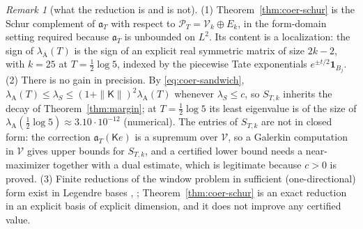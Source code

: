 \documentclass[11pt]{amsart}
\theoremstyle{definition}
\theoremstyle{remark}
\newtheorem{remark}[theorem]{Remark}
\newcommand{\PT}{\mathcal P_T}
\newcommand{\lamA}{\lambda_{\mathrm A}(T)}
\begin{document}
\begin{remark}[what the reduction is and is not]\label{rem:coer-honest}
(1) Theorem~\ref{thm:coer-schur} is the Schur complement of $\mathfrak a_T$ with respect to
$\PT=\mathcal V_k\oplus E_k$, in the form-domain setting required because $\mathfrak a_T$ is unbounded on $L^2$.
Its content is a localization: the sign of $\lamA$ is the sign of an explicit real symmetric matrix of size
$2k-2$, with $k=25$ at $T=\frac12\log5$, indexed by the piecewise Tate exponentials $e^{\pm t/2}\mathbf 1_{B_j}$.
(2) There is no gain in precision. By \eqref{eq:coer-sandwich}, $\lamA\le\lambda_S\le(1+\|\mathsf K\|)^2\lamA$
whenever $\lambda_S\le c$, so $S_{T,k}$ inherits the decay of Theorem~\ref{thm:margin}; at $T=\frac12\log5$ its
least eigenvalue is of the size of $\lambda_{\mathrm A}(\frac12\log5)\approx3.10\cdot10^{-12}$ (numerical). The
entries of $S_{T,k}$ are not in closed form: the correction $\mathfrak a_T(\mathsf Ke)$ is a supremum over $\mathcal V$,
so a Galerkin computation in $\mathcal V$ gives upper bounds for $S_{T,k}$, and a certified lower bound needs a
near-maximizer together with a dual estimate, which is legitimate because $c>0$ is proved.
(3) Finite reductions of the window problem in sufficient (one-directional) form exist in Legendre bases
\cite[Thms.~1.1, 1.4]{Zhu2026}, \cite{Groskin2026}; Theorem~\ref{thm:coer-schur} is an exact reduction in an
explicit basis of explicit dimension, and it does not improve any certified value.
\end{remark}
\end{document}
